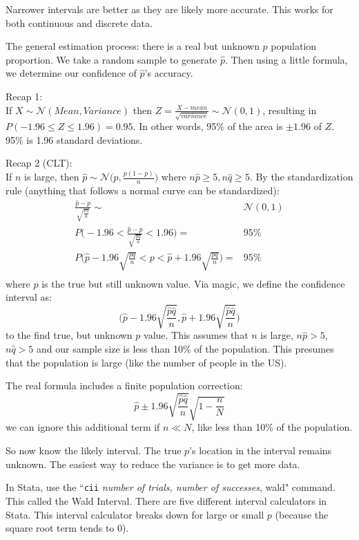 \documentclass[11pt, oneside]{article}   	%
\begin{document}
Narrower intervals are better as they are likely more accurate. This works for both continuous and discrete data. 

The general estimation process: there is a real but unknown $p$ population proportion. We take a random sample to generate $\hat{p}$. Then using a little formula, we determine our confidence of $\hat{p}$'s accuracy.

Recap 1:\\
If $X \sim \mathcal{N}(Mean, Variance)$ then $Z = \frac{X - mean} {\sqrt{variance}} \sim \mathcal{N}(0,1)$, resulting in $P(-1.96 \leq Z \leq 1.96) = 0.95$. In other words, 95\% of the area is $\pm 1.96$ of $Z$. 95\% is 1.96 standard deviations.

Recap 2 (CLT):\\
If $n$ is large, then $\hat{p} \sim \mathcal{N}\bigg( p, \frac{p(1-p)} {n} \bigg)$ where $n\hat{p} \geq 5, n\hat{q} \geq 5$. By the standardization rule (anything that follows a normal curve can be standardized):
\begin{align*}
\frac{\hat{p} - p} {\sqrt{\frac{pq}{n}}} \sim& \mathcal{N}(0,1)\\
P\bigg(-1.96 < \frac{\hat{p} - p} {\sqrt{\frac{pq}{n}}} < 1.96\bigg) =& 95\% \\
P\bigg(\hat{p} -1.96\sqrt{ \frac{pq} {n} }  < p < \hat{p} +1.96\sqrt{ \frac{pq} {n} }\bigg) =& 95\% \\
\end{align*}
where $p$ is the true but still unknown value. Via magic, we define the confidence interval as:
\[
\bigg(\hat{p} -1.96\sqrt{ \frac{\hat{p}\hat{q}} {n} }, \hat{p} +1.96\sqrt{ \frac{\hat{p}\hat{q}} {n} }\bigg) 
\]
to the find true, but unknown $p$ value. This assumes that $n$ is large, $n\hat{p} > 5$, $n\hat{q} > 5$ and our sample size is less than 10\% of the population. This presumes that the population is large (like the number of people in the US).

The real formula includes a finite population correction:
\[
\hat{p} \pm 1.96 \sqrt{\frac{\hat{p}\hat{q}} {n} } \sqrt{ 1- \frac {n} {N} } 
\]
we can ignore this additional term if $n \ll N$, like less than 10\% of the population.

So now know the likely interval. The true $p$'s location in the interval remains unknown. The easiest way to reduce the variance is to get more data.

In Stata, use the ``\texttt{cii} \textit{number of trials, number of successes}, wald" command.  This called the Wald Interval. There are five different interval calculators in Stata. This interval calculator breaks down for large or small $p$ (because the square root term tends to 0).
\end{document}
